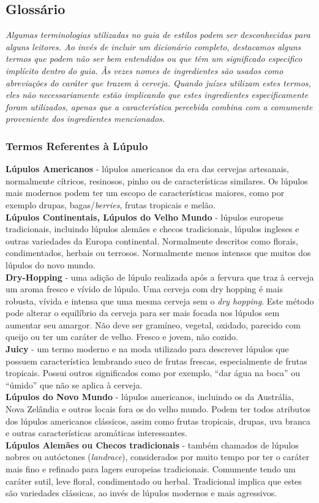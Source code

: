 \subsection*{Glossário}
\textit{Algumas terminologias utilizadas no guia de estilos podem ser desconhecidas para alguns leitores. Ao invés de incluir um dicionário completo, destacamos alguns termos que podem não ser bem entendidos ou que têm um significado especifico implícito dentro do guia. Às vezes nomes de ingredientes são usados como abreviações do caráter que trazem à cerveja. Quando juízes utilizam estes termos, eles não necessariamente estão implicando que estes ingredientes especificamente foram utilizados, apenas que a característica percebida combina com a comumente proveniente dos ingredientes mencionados.}
\subsubsection*{Termos Referentes à Lúpulo}
\textbf{Lúpulos Americanos} - lúpulos americanos da era das cervejas artesanais, normalmente cítricos, resinosos, pinho ou de características similares. Os lúpulos mais modernos podem ter um escopo de características maiores, como por exemplo drupas, bagas/\textit{berries}, frutas tropicais e melão.\\
\textbf{Lúpulos Continentais, Lúpulos do Velho Mundo} - lúpulos europeus tradicionais, incluindo lúpulos alemães e checos tradicionais, lúpulos ingleses e outras variedades da Europa continental. Normalmente descritos como florais, condimentados, herbais ou terrosos. Normalmente menos intensos que muitos dos lúpulos do novo mundo.\\
\textbf{Dry-Hopping} - uma adição de lúpulo realizada após a fervura que traz à cerveja um aroma fresco e vívido de lúpulo. Uma cerveja com dry hopping é mais robusta, vívida e intensa que uma mesma cerveja sem o \textit{dry hopping}. Este método pode alterar o equilíbrio da cerveja para ser mais focada nos lúpulos sem aumentar seu amargor. Não deve ser gramíneo, vegetal, oxidado, parecido com queijo ou ter um caráter de velho. Fresco e jovem, não cozido.\\
\textbf{Juicy} - um termo moderno e na moda utilizado para descrever lúpulos que possuem característica lembrando suco de frutas frescas, especialmente de frutas tropicais. Possui outros significados como por exemplo, “dar água na boca” ou “úmido” que não se aplica à cerveja.\\
\textbf{Lúpulos do Novo Mundo} - lúpulos americanos, incluindo os da Austrália, Nova Zelândia e outros locais fora os do velho mundo. Podem ter todos atributos dos lúpulos americanos clássicos, assim como frutas tropicais, drupas, uva branca e outras características aromáticas interessantes.\\
\textbf{Lúpulos Alemães ou Checos tradicionais} - também chamados de lúpulos nobres ou autóctones (\textit{landrace}), considerados por muito tempo por ter o caráter mais fino e refinado para lagers europeias tradicionais. Comumente tendo um caráter sutil, leve floral, condimentado ou herbal. Tradicional implica que estes são variedades clássicas, ao invés de lúpulos modernos e mais agressivos.
